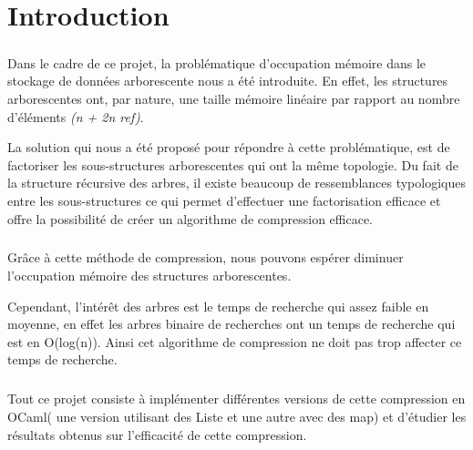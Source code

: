 \chapter{Introduction}
\paragraph{}

Dans le cadre de ce projet, la problématique d'occupation mémoire dans le stockage de données arborescente nous a été introduite.
En effet, les structures arborescentes ont, par nature, une taille mémoire linéaire par rapport au nombre d'éléments \textit{(n + 2n ref)}.

La solution qui nous a été proposé pour répondre à cette problématique, est de factoriser les sous-structures arborescentes qui ont la même topologie. Du fait de la structure récursive des arbres, il existe beaucoup de ressemblances typologiques entre les sous-structures ce qui permet d'effectuer une factorisation efficace et offre la possibilité de créer un algorithme de compression efficace.

\paragraph{}
Grâce à cette méthode de compression, nous pouvons espérer diminuer l'occupation mémoire des structures arborescentes.

Cependant, l'intérêt des arbres est le temps de recherche qui assez faible en moyenne, en effet les arbres binaire de recherches ont un temps de recherche qui est en O(log(n)). Ainsi cet algorithme de compression ne doit pas trop affecter ce temps de recherche.
\paragraph{}
Tout ce projet consiste à implémenter différentes versions de cette compression en OCaml( une version utilisant des Liste et une autre avec des map) et d'étudier les résultats obtenus sur l'efficacité de cette compression.